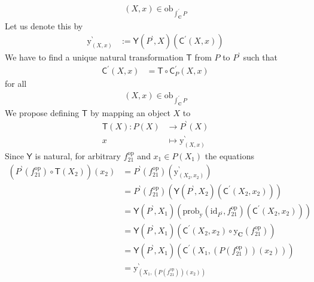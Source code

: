 \begin{prf}
\begin{description}
\begin{align*}
  (X,x)
  \in
  \mathrm{ob}_{\int_{\mathbf{C}}^{\prime}P}
\end{align*}
Let us denote this by
\begin{align*}
  \mathrm{y}_{(X,x)}^{\backprime}
  &:=
  \mathsf{Y}(P^{\backprime},X)
  \left(
    \mathsf{C}^{\prime}(X,x)
  \right)
\end{align*}
We have to find a unique natural transformation $\mathsf{T}$ from $P$ to $P^{\backprime}$ such that
\begin{align*}
  \mathsf{C}^{\prime}(X,x)
  &=
  \mathsf{T}
  \circ
  \mathsf{C}_{P}^{\prime}(X,x)
\end{align*}
for all
\begin{align*}
  (X,x)
  \in
  \mathrm{ob}_{\int_{\mathbf{C}}^{\prime}P}
\end{align*}
We propose defining $\mathsf{T}$ by mapping an object $X$ to
\begin{align*}
  \mathsf{T}(X)
  \colon
  P(X)
  &\rightarrow
  P^{\backprime}(X)
  \\
  x
  &\mapsto
  \mathrm{y}_{(X,x)}^{\backprime}
\end{align*}
Since $\mathsf{Y}$ is natural, for arbitrary $f_{21}^{\mathrm{op}}$ and $x_{1} \in P(X_{1})$
the equations
\begin{align*}
  \left(
    P^{\backprime}(f_{21}^{\mathrm{op}})
    \circ
    \mathsf{T}(X_{2})
  \right)
  (x_{2})
  &=
  P^{\backprime}(f_{21}^{\mathrm{op}})
  \left(
    \mathrm{y}_{(X_{2},x_{2})}^{\backprime}
  \right)
  \\
  &=
  P^{\backprime}(f_{21}^{\mathrm{op}})
  \left(
    \mathsf{Y}(P^{\backprime},X_{2})
    \left(
      \mathsf{C}^{\prime}(X_{2},x_{2})
    \right)
  \right)
  \\
  &=
  \mathsf{Y}(P^{\backprime},X_{1})
  \left(
    \mathrm{prob}_{\mathrm{y}}
    \left(
      \mathrm{id}_{P^{\backprime}},
      f_{21}^{\mathrm{op}}
    \right)
    \left(
      \mathsf{C}^{\prime}(X_{2},x_{2})
    \right)
  \right)
  \tag{NT}
  \\
  &=
  \mathsf{Y}(P^{\backprime},X_{1})
  \left(
    \mathsf{C}^{\prime}(X_{2},x_{2})
    \circ
    \mathrm{y}_{\mathbf{C}}(f_{21}^{\mathrm{op}})
  \right)
  \\
  &=
  \mathsf{Y}(P^{\backprime},X_{1})
  \left(
    \mathsf{C}^{\prime}
    \left(
      X_{1},
      \left(
        P(f_{21}^{\mathrm{op}})
      \right)
      (x_{2})
    \right)
  \right)
  \\
  &=
  \mathrm{y}_{(X_{1},(P(f_{21}^{\mathrm{op}}))(x_{2}))}^{\backprime}

\end{align*}
\end{description}
\end{prf}
